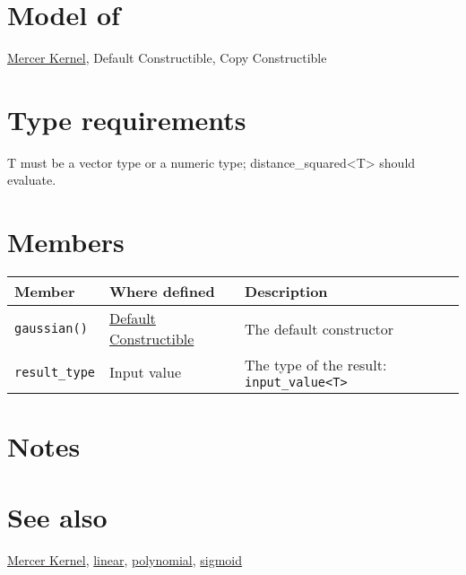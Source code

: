 \documentclass{article}
\begin{document}
\section*{Model of}

\href{\kmlroot/mercer_kernel.html}{Mercer Kernel}, 
Default Constructible, Copy Constructible


\section*{Type requirements}
T must be a vector type or a numeric type; distance_squared<T> should evaluate.

\section*{Members}

\begin{tabular}{lll}
\textbf{Member} & \textbf{Where defined} & \textbf{Description} \\ 
\hline
\texttt{gaussian()} & \href{http://www.sgi.com/tech/stl/DefaultConstructible.html}{Default Constructible} & The default constructor \\
\texttt{result_type} & Input value & The type of the result: \texttt{input_value<T>} \\
\end{tabular}

\section*{Notes}

\section*{See also}

\href{\kmlroot/mercer_kernel.html}{Mercer Kernel},
\href{\kmlroot/linear.html}{linear},
\href{\kmlroot/polynomial.html}{polynomial},
\href{\kmlroot/sigmoid.html}{sigmoid}



\end{document}
